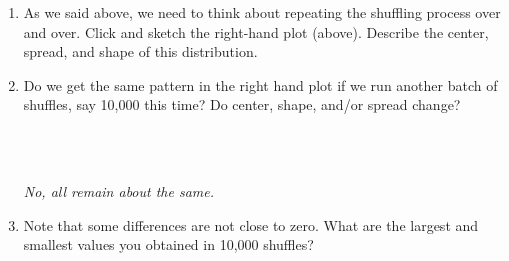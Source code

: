 \begin{enumerate}
\begin{enumerate}
\begin{key}
 {\it centered about zero?}
\end{key}
\end{enumerate}

\item As we said above, we need to think about repeating the shuffling
  process over and over.  Click  and sketch the
  right-hand plot (above).  Describe the center,
  spread, and shape of this distribution.

\item Do we get the same pattern in the right hand plot if we run
  another batch of shuffles, say 10,000 this time?    Do
  center, shape, and/or spread change?
\begin{students}
        \vspace{2cm}\\
\end{students}
\begin{key}
  \\ {\it  No, all remain about the same.}
\end{key}


\item Note that some differences are not close to zero.  What are the
  largest and smallest values you obtained in 10,000 shuffles?
\begin{students}
        \vspace{.8cm}\\
\end{students}


\end{enumerate}

